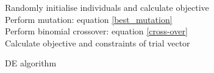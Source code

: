 \begin{algorithm}[!ht]
\SetAlgoNoLine
 Randomly initialise individuals and calculate objective\\
 {
  {
  Perform mutation: equation \ref{best_mutation}\\
  Perform binomial crossover: equation \ref{cross-over}\\
  Calculate objective and constraints of trial vector
  }
 }
 \caption{DE algorithm}
 \label{DE algorithm}
\end{algorithm}